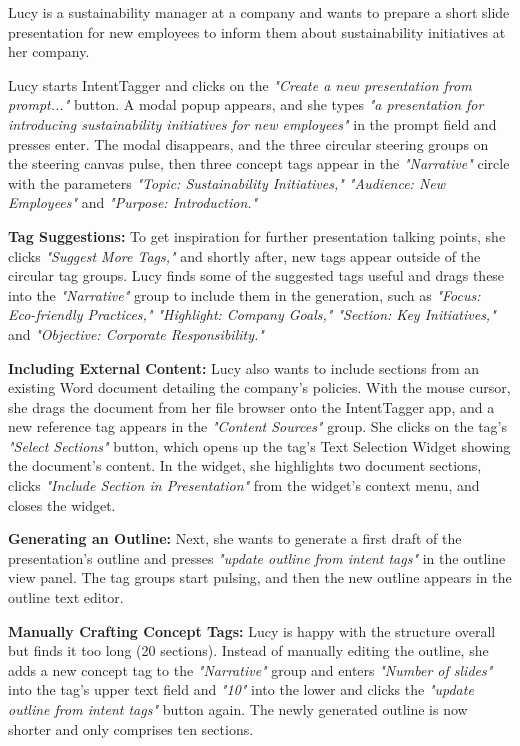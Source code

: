 Lucy is a sustainability manager at a company and wants to prepare a short slide presentation for new employees to inform them about sustainability initiatives at her company. 

Lucy starts IntentTagger and clicks on the \textit{"Create a new presentation from prompt..."} button. 
A modal popup appears, and she types \textit{"a presentation for introducing sustainability initiatives for new employees"} in the prompt field and presses enter. 
The modal disappears, and the three circular steering groups on the steering canvas pulse, then three concept tags appear in the \textit{"Narrative"} circle with the parameters \textit{"Topic: Sustainability Initiatives," "Audience: New Employees"} and \textit{"Purpose: Introduction."} 

\textbf{Tag Suggestions:} To get inspiration for further presentation talking points, she clicks \textit{"Suggest More Tags,"} and shortly after, new tags appear outside of the circular tag groups. Lucy finds some of the suggested tags useful and drags these into the \textit{"Narrative"} group to include them in the generation, such as \textit{"Focus: Eco-friendly Practices," "Highlight: Company Goals," "Section: Key Initiatives,"} and \textit{"Objective: Corporate Responsibility."}

\textbf{Including External Content:}
Lucy also wants to include sections from an existing Word document detailing the company's policies. With the mouse cursor, she drags the document from her file browser onto the IntentTagger app, and a new reference tag appears in the \textit{"Content Sources"} group. She clicks on the tag's \textit{"Select Sections"} button, which opens up the tag's Text Selection Widget showing the document's content. In the widget, she highlights two document sections, clicks \textit{"Include Section in Presentation"} from the widget's context menu, and closes the widget. 

\textbf{Generating an Outline:}
Next, she wants to generate a first draft of the presentation's outline and presses \textit{"update outline from intent tags"} in the outline view panel. The tag groups start pulsing, and then the new outline appears in the outline text editor. 

\textbf{Manually Crafting Concept Tags:}
Lucy is happy with the structure overall but finds it too long (20 sections). Instead of manually editing the outline, she adds a new concept tag to the \textit{"Narrative"} group and enters \textit{"Number of slides"} into the tag's upper text field and \textit{"10"} into the lower and clicks the \textit{"update outline from intent tags"} button again. The newly generated outline is now shorter and only comprises ten sections. 

